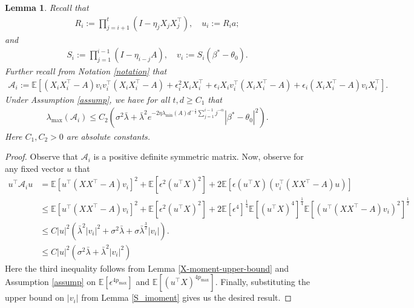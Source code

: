 \documentclass[11pt, reqno,english]{amsart}
\newtheorem{lemma}{Lemma}[section]
\begin{document}
\begin{lemma}\label{lem:calNnegEc}
Recall that 
\begin{align*}
    R_i := \prod_{j = i+1}^t (I - \eta_j X_j X^\top_j), \quad u_i:= R_i a;
\end{align*} 
and 
\begin{align*}
S_i := \prod_{j = 1}^{i-1} (I - \eta_{i-j}A), \quad v_i := S_i(\beta^* - \theta_0).
\end{align*}
Further recall from Notation \ref{notation} that 
\begin{align*}
\mathcal A_i := \mathbb{E}[(X_iX_i^\top - A)v_i v_i^\top (X_iX_i^\top - A) + \epsilon^2_iX_iX_i^\top + \epsilon_i X_iv^\top_i(X_iX_i^\top - A) + \epsilon_i (X_iX^\top_i - A)v_i X^\top_i].
\end{align*}
Under Assumption \ref{assump}, we have for all $t,d \geq C_1$ that
\begin{align*}
    \lambda_{\max}(\mathcal A_i) \leq C_2(\sigma^2 \bar{\lambda}  + \bar{\lambda}^2e^{-2\eta \lambda_{\min}(A)d^{-\frac{1}{2}}\sum_{j  = 1}^{i-1}j^{-\alpha}}|\beta^* - \theta_0|^2).
\end{align*}
Here $C_1, C_2 > 0$ are absolute constants.
\end{lemma}
\begin{proof}
Observe that $\mathcal A_i$ is a positive definite symmetric matrix. Now, observe for any fixed vector $u$ that
\begin{align*}
u^\top \mathcal A_i u &= \mathbb{E}[u^\top (XX^\top - A) v_i]^2 + \mathbb{E}[\epsilon^2(u^\top X)^2] + 2\mathbb{E}[\epsilon (u^\top X)(v^\top_i (XX^\top - A)u)]
\\
&\leq \mathbb{E}[u^\top (XX^\top - A) v_i]^2 + \mathbb{E}[\epsilon^2(u^\top X)^2] + 2\mathbb{E}[\epsilon^4]^{\frac{1}{4}}\mathbb{E}[(u^\top X)^4]^{\frac{1}{4}}\mathbb{E}[(u^\top( XX^\top - A)v_i)^2]^{\frac{1}{2}}
\\
&\leq C|u|^2 (\bar{\lambda}^2 |v_i|^2 + \sigma^2 \bar{\lambda} + \sigma \bar{\lambda}^{\frac{3}{2}}|v_i|).
\\
&\leq  C|u|^2 (\sigma^2 \bar{\lambda} + \bar{\lambda}^2 |v_i|^2)
\end{align*}
Here the third inequality follows from Lemma \ref{X-moment-upper-bound} and Assumption \ref{assump} on $\mathbb{E}[\epsilon^{4p_{\max}}]$ and $\mathbb{E}[(u^\top X)^{4p_{\max}}]$. Finally, substituting the upper bound on $|v_i|$ from Lemma \ref{S_imoment} gives us the desired result.
\end{proof}
\end{document}

